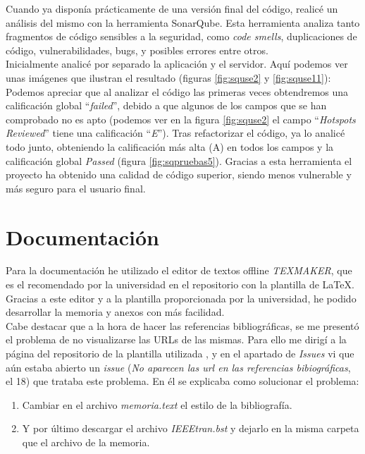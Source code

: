 Cuando ya disponía prácticamente de una versión final del código, realicé un análisis del mismo con la herramienta SonarQube. Esta herramienta analiza tanto fragmentos de código sensibles a la seguridad, como \textit{code smells}, duplicaciones de código, vulnerabilidades, bugs, y posibles errores entre otros.\\
Inicialmente analicé por separado la aplicación y el servidor. Aquí podemos ver unas imágenes que ilustran el resultado (figuras \ref{fig:squse2} y \ref{fig:squse11}):
Podemos apreciar que al analizar el código las primeras veces obtendremos una calificación global ``\textit{failed}'', debido a que algunos de los campos que se han comprobado no es apto (podemos ver en la figura \ref{fig:squse2} el campo ``\textit{Hotspots Reviewed}'' tiene una calificación ``\textit{E}'').
Tras refactorizar el código, ya lo analicé todo junto, obteniendo la calificación más alta (A) en todos los campos y la calificación global \textit{Passed} (figura \ref{fig:sqpruebas5}).
Gracias a esta herramienta el proyecto ha obtenido una calidad de código superior, siendo menos vulnerable y más seguro para el usuario final.



\section{Documentación}

Para la documentación he utilizado el editor de textos offline \textit{TEXMAKER}, que es el recomendado por la universidad en el repositorio con la plantilla de \LaTeX. Gracias a este editor y a la plantilla proporcionada por la universidad, he podido desarrollar la memoria y anexos con más facilidad.\\

Cabe destacar que a la hora de hacer las referencias bibliográficas, se me presentó el problema de no visualizarse las URLs de las mismas. Para ello me dirigí a la página del repositorio de la plantilla utilizada \cite{plantilalatex}, y en el apartado de \textit{Issues} vi que aún estaba abierto un \textit{issue} (\textit{No aparecen las url en las referencias bibiográficas}, el 18) que trataba este problema. En él se explicaba como solucionar el problema:
\begin{enumerate}
\item
	Cambiar en el archivo \textit{memoria.text} el estilo de la bibliografía.
\item
	Y por último descargar el archivo \textit{IEEEtran.bst} y dejarlo en la misma carpeta que el archivo de la memoria.
\end{enumerate}

